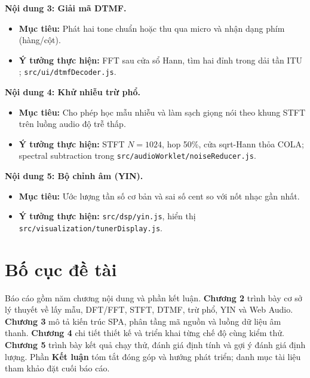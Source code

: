 \noindent\textbf{Nội dung 3: Giải mã DTMF.}\\
\vspace{-0.6cm}
\begin{itemize}\itemsep0pt \parskip0pt 
	\item \textbf{Mục tiêu:} Phát hai tone chuẩn hoặc thu qua micro và nhận dạng phím (hàng/cột).
	\item \textbf{Ý tưởng thực hiện:} FFT sau cửa sổ Hann, tìm hai đỉnh trong dải tần ITU \cite{ituQ23}; \verb|src/ui/dtmfDecoder.js|.
\end{itemize}
\vspace{-0.2cm}

\noindent\textbf{Nội dung 4: Khử nhiễu trừ phổ.}\\
\vspace{-0.6cm}
\begin{itemize}\itemsep0pt \parskip0pt 
	\item \textbf{Mục tiêu:} Cho phép học mẫu nhiễu và làm sạch giọng nói theo khung STFT trên luồng audio độ trễ thấp.
	\item \textbf{Ý tưởng thực hiện:} STFT $N{=}1024$, hop 50\%, cửa sqrt-Hann thỏa COLA; spectral subtraction trong \verb|src/audioWorklet/noiseReducer.js|.
\end{itemize}
\vspace{-0.2cm}

\noindent\textbf{Nội dung 5: Bộ chỉnh âm (YIN).}\\
\vspace{-0.6cm}
\begin{itemize}\itemsep0pt \parskip0pt 
	\item \textbf{Mục tiêu:} Ước lượng tần số cơ bản và sai số cent so với nốt nhạc gần nhất.
	\item \textbf{Ý tưởng thực hiện:} \verb|src/dsp/yin.js|, hiển thị \verb|src/visualization/tunerDisplay.js|.
\end{itemize}
\vspace{-0.2cm}

\section{Bố cục đề tài}
Báo cáo gồm năm chương nội dung và phần kết luận. \textbf{Chương 2} trình bày cơ sở lý thuyết về lấy mẫu, DFT/FFT, STFT, DTMF, trừ phổ, YIN và Web Audio. \textbf{Chương 3} mô tả kiến trúc SPA, phân tầng mã nguồn và luồng dữ liệu âm thanh. \textbf{Chương 4} chi tiết thiết kế và triển khai từng chế độ cùng kiểm thử. \textbf{Chương 5} trình bày kết quả chạy thử, đánh giá định tính và gợi ý đánh giá định lượng. Phần \textbf{Kết luận} tóm tắt đóng góp và hướng phát triển; danh mục tài liệu tham khảo đặt cuối báo cáo.
